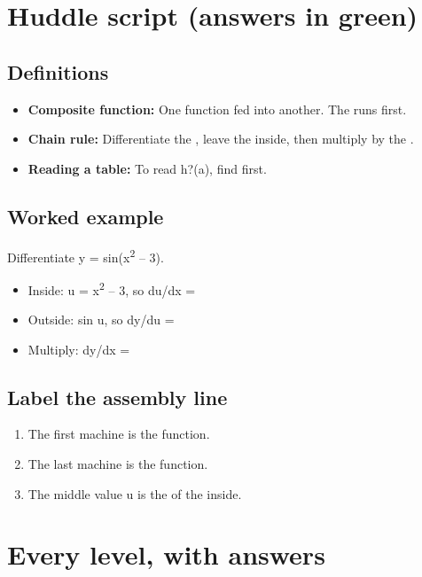 \documentclass[11pt]{article}
\begin{document}
\section*{Huddle script (answers in green)}
\subsection*{Definitions}\begin{itemize}
\item \textbf{Composite function:} One function fed into another. The  runs first.
\item \textbf{Chain rule:} Differentiate the , leave the inside, then multiply by the .
\item \textbf{Reading a table:} To read h?(a), find  first.
\end{itemize}
\subsection*{Worked example}
Differentiate y = sin(x\textsuperscript{2} -- 3).\\
\begin{itemize}
\item Inside: u = x\textsuperscript{2} -- 3, so du/dx = 
\item Outside: sin u, so dy/du = 
\item Multiply: dy/dx = 
\end{itemize}
\subsection*{Label the assembly line}
\begin{enumerate}
\item The first machine is the  function.
\item The last machine is the  function.
\item The middle value u is the  of the inside.
\end{enumerate}
\section*{Every level, with answers}
\end{document}
